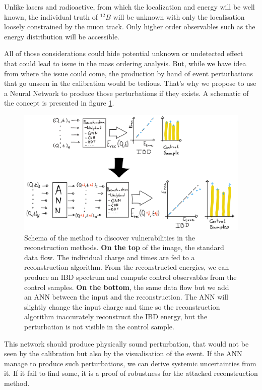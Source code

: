 \documentclass[../main.tex]{subfiles}
\begin{document}
Unlike lasers and radioactive, from which the localization and energy will be well known, the individual truth of $^{12}B$ will be unknown with only the localisation loosely constrained by the muon track. Only higher order observables such as the energy distribution will be accessible.

All of those considerations could hide potential unknown or undetected effect that could lead to issue in the mass ordering analysis. But, while we have idea from where the issue could come, the production by hand of event perturbations that go unseen in the calibration would be tedious. That's why we propose to use a Neural Network to produce those perturbations if they exists. A schematic of the concept is presented in figure \ref{fig:janne:method:schema}.

\begin{figure}[ht]
  \centering
  \includegraphics[width=\linewidth]{images/janne/ann_method.jpg}
  \caption{Schema of the method to discover vulnerabilities in the reconstruction methods. \textbf{On the top} of the image, the standard data flow. The individual charge and times are fed to a reconstruction algorithm. From the reconstructed energies, we can produce an IBD spectrum and compute control observables from the control samples. \textbf{On the bottom}, the same data flow but we add an ANN between the input and the reconstruction. The ANN will slightly change the input charge and time so the reconstruction algorithm inaccurately reconstruct the IBD energy, but the perturbation is not visible in the control sample.}
  \label{fig:janne:method:schema}
\end{figure}

This network should produce physically sound perturbation, that would not be seen by the calibration but also by the visualisation of the event. If the ANN manage to produce such perturbations, we can derive systemic uncertainties from it. If it fail to find some, it is a proof of robustness for the attacked reconstruction method.
\end{document}
